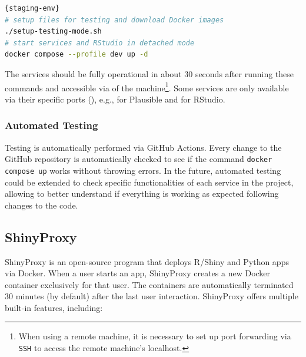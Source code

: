 \begin{lstlisting}[caption=Setup testing environment.,language=bash,label={lst:staging-env}]{staging-env}
# setup files for testing and download Docker images
./setup-testing-mode.sh
# start services and RStudio in detached mode
docker compose --profile dev up -d
\end{lstlisting}

The services should be fully operational in about 30 seconds after running these commands and accessible via  of the machine\footnote{When using a remote machine, it is necessary to set up port forwarding via \texttt{SSH} to access the remote machine's localhost.}. Some services are only available via their specific ports (), e.g.,  for Plausible and  for RStudio.

\subsubsection{Automated Testing}

Testing is automatically performed via GitHub Actions. Every change to the GitHub repository is automatically checked to see if the command \texttt{docker compose up} works without throwing errors. In the future, automated testing could be extended to check specific functionalities of each service in the project, allowing to better understand if everything is working as expected following changes to the code.

\subsection{ShinyProxy}

ShinyProxy is an open-source program that deploys R/Shiny and Python apps via Docker. When a user starts an app, ShinyProxy creates a new Docker container exclusively for that user. The containers are automatically terminated 30 minutes (by default) after the last user interaction. ShinyProxy offers multiple built-in features, including:

